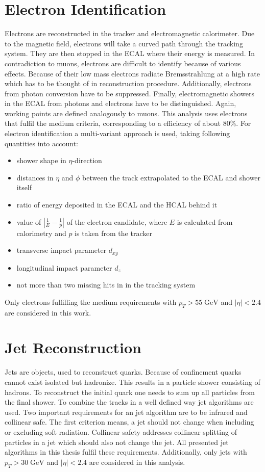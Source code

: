 \section{Electron Identification}
	Electrons are reconstructed in the tracker and electromagnetic calorimeter. Due to the magnetic field, electrons will take a curved path through the tracking system. They are then stopped in the ECAL where their energy is measured. In contradiction to muons, electrons are difficult to identify because of various effects. Because of their low mass electrons radiate Bremsstrahlung at a high rate which has to be thought of in reconstruction procedure. Additionally, electrons from photon conversion have to be suppressed. Finally, electromagnetic showers in the ECAL from photons and electrons have to be distinguished. Again, working points are defined analogously to muons. This analysis uses electrons that fulfil the medium criteria, corresponding to a efficiency of about $80\%$. For electron identification a multi-variant approach is used, taking following quantities into account:
	\begin{itemize}
	\item shower shape in $\eta$-direction
	\item distances in $\eta$ and $\phi$ between the track extrapolated to the ECAL and shower itself
	\item ratio of energy deposited in the ECAL and the HCAL behind it
	\item value of $|\frac{1}{E} - \frac{1}{p}|$ of the electron candidate, where $E$ is calculated from calorimetry and $p$ is taken from the tracker
	\item transverse impact parameter $d_{xy}$
	\item longitudinal impact parameter $d_{z}$
	\item not more than two missing hits in in the tracking system
	\end{itemize}
	Only electrons fulfilling the medium requirements with $p_T > 55\;\text{GeV}$ and $|\eta| < 2.4$ are considered in this work.
\section{Jet Reconstruction}
	Jets are objects, used to reconstruct quarks. Because of confinement quarks cannot exist isolated but hadronize. This results in a particle shower consisting of hadrons. To reconstruct the initial quark one needs to sum up all particles from the final shower. To combine the tracks in a well defined way jet algorithms are used. Two important requirements for an jet algorithm are to be infrared and collinear safe. The first criterion means, a jet should not change when including or excluding soft radiation. Collinear safety addresses collinear splitting of particles in a jet which should also not change the jet. All presented jet algorithms in this thesis fulfil these requirements. Additionally, only jets with $p_T > 30\;\text{GeV}$ and $|\eta| < 2.4$ are considered in this analysis.
